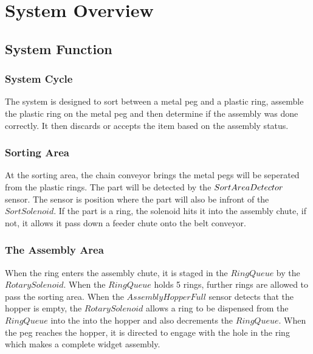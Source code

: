 \documentclass[12pt]{article}
\begin{document}
\section{System Overview}
  \subsection{System Function}
    \subsubsection{System Cycle}
      The system is designed to sort between a metal peg and a plastic ring, assemble
      the plastic ring on the metal peg and then determine if the assembly was done 
      correctly. It then discards or accepts the item based on the assembly status.

    \subsubsection{Sorting Area}

      At the sorting area, the chain conveyor brings the metal pegs will be sep\-erated
      from the plastic rings. The part will be detected by the $Sort\-Area\-Detector$ 
      sensor. The sensor is position where the part will also be infront of the 
      $SortSolenoid$. If the part is a ring, the solenoid hits it into the 
      assembly chute, if not, it allows it pass down a feeder chute onto the belt
      conveyor.

    \subsubsection{The Assembly Area}
      When the ring enters the assembly chute, it is staged in the $RingQueue$
      by the $RotarySolenoid$. When the $RingQueue$ holds 5 rings, further rings are
      allowed to pass the sorting area.
      \bigbreak
      When the $AssemblyHopperFull$ sensor detects that the hopper is empty, the 
      $RotarySolenoid$ allows a ring to be dispensed from the $RingQueue$ into the
      into the hopper and also decrements the $RingQueue$.
      \bigbreak
      When the peg reaches the hopper, it is directed to engage with the hole in the ring
      which makes a complete widget assembly.
\end{document}
